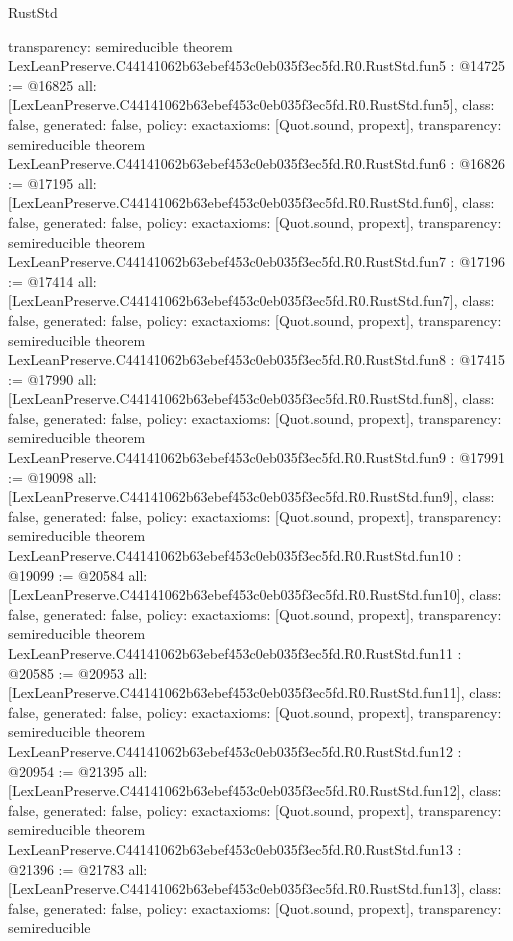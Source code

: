 \begin{lexlean}{RustStd}
\begin{coremodule}
{  transparency: semireducible
}
theorem LexLeanPreserve.C44141062b63ebef453c0eb035f3ec5fd.R0.RustStd.fun5 : @14725 := @16825 {
  all: [LexLeanPreserve.C44141062b63ebef453c0eb035f3ec5fd.R0.RustStd.fun5],
  class: false,
  generated: false,
  policy: exact{axioms: [Quot.sound, propext]},
  transparency: semireducible
}
theorem LexLeanPreserve.C44141062b63ebef453c0eb035f3ec5fd.R0.RustStd.fun6 : @16826 := @17195 {
  all: [LexLeanPreserve.C44141062b63ebef453c0eb035f3ec5fd.R0.RustStd.fun6],
  class: false,
  generated: false,
  policy: exact{axioms: [Quot.sound, propext]},
  transparency: semireducible
}
theorem LexLeanPreserve.C44141062b63ebef453c0eb035f3ec5fd.R0.RustStd.fun7 : @17196 := @17414 {
  all: [LexLeanPreserve.C44141062b63ebef453c0eb035f3ec5fd.R0.RustStd.fun7],
  class: false,
  generated: false,
  policy: exact{axioms: [Quot.sound, propext]},
  transparency: semireducible
}
theorem LexLeanPreserve.C44141062b63ebef453c0eb035f3ec5fd.R0.RustStd.fun8 : @17415 := @17990 {
  all: [LexLeanPreserve.C44141062b63ebef453c0eb035f3ec5fd.R0.RustStd.fun8],
  class: false,
  generated: false,
  policy: exact{axioms: [Quot.sound, propext]},
  transparency: semireducible
}
theorem LexLeanPreserve.C44141062b63ebef453c0eb035f3ec5fd.R0.RustStd.fun9 : @17991 := @19098 {
  all: [LexLeanPreserve.C44141062b63ebef453c0eb035f3ec5fd.R0.RustStd.fun9],
  class: false,
  generated: false,
  policy: exact{axioms: [Quot.sound, propext]},
  transparency: semireducible
}
theorem LexLeanPreserve.C44141062b63ebef453c0eb035f3ec5fd.R0.RustStd.fun10 : @19099 := @20584 {
  all: [LexLeanPreserve.C44141062b63ebef453c0eb035f3ec5fd.R0.RustStd.fun10],
  class: false,
  generated: false,
  policy: exact{axioms: [Quot.sound, propext]},
  transparency: semireducible
}
theorem LexLeanPreserve.C44141062b63ebef453c0eb035f3ec5fd.R0.RustStd.fun11 : @20585 := @20953 {
  all: [LexLeanPreserve.C44141062b63ebef453c0eb035f3ec5fd.R0.RustStd.fun11],
  class: false,
  generated: false,
  policy: exact{axioms: [Quot.sound, propext]},
  transparency: semireducible
}
theorem LexLeanPreserve.C44141062b63ebef453c0eb035f3ec5fd.R0.RustStd.fun12 : @20954 := @21395 {
  all: [LexLeanPreserve.C44141062b63ebef453c0eb035f3ec5fd.R0.RustStd.fun12],
  class: false,
  generated: false,
  policy: exact{axioms: [Quot.sound, propext]},
  transparency: semireducible
}
theorem LexLeanPreserve.C44141062b63ebef453c0eb035f3ec5fd.R0.RustStd.fun13 : @21396 := @21783 {
  all: [LexLeanPreserve.C44141062b63ebef453c0eb035f3ec5fd.R0.RustStd.fun13],
  class: false,
  generated: false,
  policy: exact{axioms: [Quot.sound, propext]},
  transparency: semireducible
}
\end{coremodule}
\end{lexlean}
